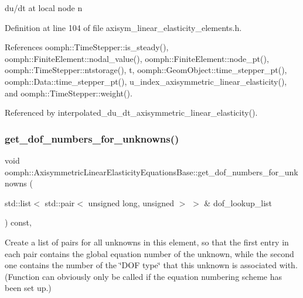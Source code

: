 du/dt at local node n 



Definition at line 104 of file axisym\+\_\+linear\+\_\+elasticity\+\_\+elements.\+h.



References oomph\+::\+Time\+Stepper\+::is\+\_\+steady(), oomph\+::\+Finite\+Element\+::nodal\+\_\+value(), oomph\+::\+Finite\+Element\+::node\+\_\+pt(), oomph\+::\+Time\+Stepper\+::ntstorage(), t, oomph\+::\+Geom\+Object\+::time\+\_\+stepper\+\_\+pt(), oomph\+::\+Data\+::time\+\_\+stepper\+\_\+pt(), u\+\_\+index\+\_\+axisymmetric\+\_\+linear\+\_\+elasticity(), and oomph\+::\+Time\+Stepper\+::weight().



Referenced by interpolated\+\_\+du\+\_\+dt\+\_\+axisymmetric\+\_\+linear\+\_\+elasticity().

\mbox{\label{classoomph_1_1AxisymmetricLinearElasticityEquationsBase_a714fb359257e5a262e2e1368fcfc1ccb}} 
\subsubsection{\texorpdfstring{get\+\_\+dof\+\_\+numbers\+\_\+for\+\_\+unknowns()}{get\_dof\_numbers\_for\_unknowns()}}
{\footnotesize\ttfamily void oomph\+::\+Axisymmetric\+Linear\+Elasticity\+Equations\+Base\+::get\+\_\+dof\+\_\+numbers\+\_\+for\+\_\+unknowns (\begin{DoxyParamCaption}\item[{std\+::list$<$ std\+::pair$<$ unsigned long, unsigned $>$ $>$ \&}]{dof\+\_\+lookup\+\_\+list }\end{DoxyParamCaption}) const\hspace{0.3cm}{\ttfamily [inline]}, {\ttfamily [virtual]}}



Create a list of pairs for all unknowns in this element, so that the first entry in each pair contains the global equation number of the unknown, while the second one contains the number of the \char`\"{}\+D\+O\+F type\char`\"{} that this unknown is associated with. (Function can obviously only be called if the equation numbering scheme has been set up.) 



